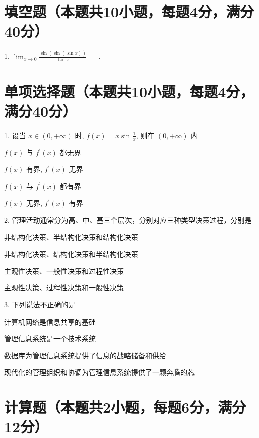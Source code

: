\documentclass{SEUExam}
\author{Southeast University·Jieal}
\begin{document}
\maketitle

\section{填空题（本题共10小题，每题4分，满分40分）}

1. $\lim _{x \to 0} \frac{\sin (\sin (\sin x))}{\tan x}=$
  \fillin[ ].


\section{单项选择题（本题共10小题，每题4分，满分40分）}

  1. 设当 $x \in(0,+\infty)$ 时, $f(x)=x \sin \frac{1}{x}$, 则在 $(0,+\infty)$ 内
  \paren[ ]
  \begin{choices}
    \item $f(x)$ 与 $f^{\prime}(x)$ 都无界
    \item $f(x)$ 有界, $f^{\prime}(x)$ 无界
    \item $f(x)$ 与 $f^{\prime}(x)$ 都有界
    \item $f(x)$ 无界, $f^{\prime}(x)$ 有界
  \end{choices}

  2. 管理活动通常分为高、中、基三个层次，分别对应三种类型决策过程，分别是 \paren[ ]
  \begin{choices}
    \item 非结构化决策、半结构化决策和结构化决策
    \item 非结构化决策、结构化决策和半结构化决策
    \item 主观性决策、一般性决策和过程性决策
    \item 主观性决策、过程性决策和一般性决策
  \end{choices}
  
  3. 下列说法不正确的是 \paren[ ]
  \begin{choices}
    \item 计算机网络是信息共享的基础
    \item 管理信息系统是一个技术系统
    \item 数据库为管理信息系统提供了信息的战略储备和供给
    \item 现代化的管理组织和协调为管理信息系统提供了一颗奔腾的芯
  \end{choices}
  
\section{计算题（本题共2小题，每题6分，满分12分）}
\end{document}
